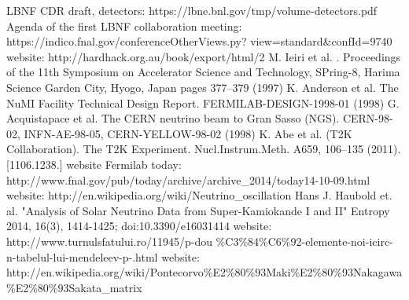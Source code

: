 \begin{frame}[allowframebreaks]
\begin{thebibliography}{1}
    LBNF CDR draft, detectors: https://lbne.bnl.gov/tmp/volume-detectors.pdf
    Agenda of the first LBNF collaboration meeting: https://indico.fnal.gov/conferenceOtherViews.py? view=standard\&confId=9740
    website: http://hardhack.org.au/book/export/html/2
    M. Ieiri et al. . Proceedings of the 11th Symposium on Accelerator Science and Technology, SPring-8, Harima Science Garden City, Hyogo, Japan pages 377–379 (1997)
    K. Anderson et al. The NuMI Facility Technical Design Report. FERMILAB-DESIGN-1998-01 (1998)
    G. Acquistapace et al. The CERN neutrino beam to Gran Sasso (NGS). CERN-98-02, INFN-AE-98-05, CERN-YELLOW-98-02 (1998)
    K. Abe et al. (T2K Collaboration). The T2K Experiment. Nucl.Instrum.Meth. A659, 106–135 (2011). [1106.1238.]
    website Fermilab today: http://www.fnal.gov/pub/today/archive/archive\_2014/today14-10-09.html
    website: http://en.wikipedia.org/wiki/Neutrino\_oscillation
    Hans J. Haubold et. al. "Analysis of Solar Neutrino Data from Super-Kamiokande I and II" Entropy 2014, 16(3), 1414-1425; doi:10.3390/e16031414
    website: http://www.turnulsfatului.ro/11945/p-dou \%C3\%84\%C6\%92-elemente-noi-icirc-n-tabelul-lui-mendeleev-p-.html
    website: http://en.wikipedia.org/wiki/Pontecorvo\%E2\%80\%93Maki\%E2\%80\%93Nakagawa\%E2\%80\%93Sakata\_matrix
\end{thebibliography}
\end{frame}
